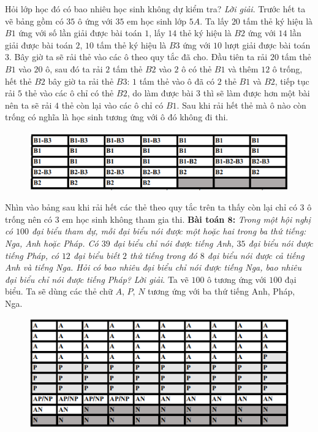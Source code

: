 \begin{multicols}{2}
{	Hỏi lớp học đó có bao nhiêu học sinh không dự kiểm tra?}
	\vskip 0.1cm
	\textit{Lời giải}.
	Trước hết ta vẽ bảng gồm có $35$ ô ứng với $35$ em học sinh lớp $5A$. Ta lấy $20$ tấm thẻ ký hiệu là $B1$ ứng với số lần giải được bài toán $1$, lấy $14$ thẻ ký hiệu là $B2$ ứng với $14$ lần giải được bài toán $2$, $10$ tấm thẻ ký hiệu là $B3$ ứng với $10$ lượt giải được bài toán $3$. Bây giờ ta sẽ rải thẻ vào các ô theo quy tắc đã cho. Đầu tiên ta rải $20$ tấm thẻ $B1$ vào $20$ ô, sau đó ta rải $2$ tấm thẻ $B2$ vào $2$ ô có thẻ $B1$ và thêm $12$ ô trống, hết thẻ $B2$ bây giờ ta rải thẻ $B3$: $1$ tấm thẻ vào ô đã có $2$ thẻ $B1$ và $B2$, tiếp tục rải $5$ thẻ vào các ô chỉ có thẻ $B2$, do làm được bài $3$ thì sẽ làm được hơn một bài nên ta sẽ rải $4$ thẻ còn lại vào các ô chỉ có $B1$. Sau khi rải hết thẻ mà ô nào còn trống có nghĩa là học sinh tương ứng với ô đó không đi thi.
	\begin{figure}[H]
		\vspace*{-5pt}
		\centering
		\captionsetup{labelformat= empty, justification=centering}
		\includegraphics[width= 1\linewidth]{8}
		\vspace*{-15pt}
	\end{figure}	
	Nhìn vào bảng sau khi rải hết các thẻ theo quy tắc trên ta thấy còn lại chỉ có $3$ ô trống nên có $3$ em học sinh không tham gia thi.
	\vskip 0.1cm
	\textbf{\color{diendantoanhoc}Bài toán $\pmb8$:} 
	\vskip 0.1cm
	\textit{Trong một hội nghị có $100$ đại biểu tham dự, mỗi đại biểu nói được một hoặc hai trong ba thứ tiếng: Nga, Anh hoặc Pháp. Có $39$ đại biểu chỉ nói được tiếng Anh, $35$ đại biểu nói được tiếng Pháp, có $12$ đại biểu biết $2$ thứ tiếng trong đó $8$ đại biểu nói được cả tiếng Anh và tiếng Nga. Hỏi có bao nhiêu đại biểu chỉ nói được tiếng Nga, bao nhiêu đại biểu chỉ nói được tiếng Pháp?}
	\vskip 0.1cm
	\textit{Lời giải}. Ta vẽ $100$ ô tương ứng với $100$ đại biểu. Ta sẽ dùng các thẻ chữ $A$, $P$, $N$ tương ứng với ba thứ tiếng Anh, Pháp, Nga.
		\begin{figure}[H]
		\vspace*{-5pt}
		\centering
		\captionsetup{labelformat= empty, justification=centering}
		\includegraphics[width= 1\linewidth]{9}

\end{figure}
\end{multicols}
